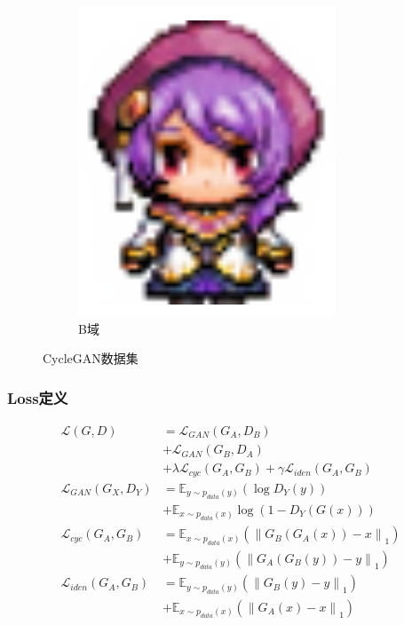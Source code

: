 \documentclass{beamer}
\newcommand\norm[1]{\left\lVert#1\right\rVert}
\begin{document}
\begin{frame}
\begin{figure}[htb]
\begin{subfigure}[b]{0.2\linewidth}
        \includegraphics[width=\linewidth]{bigsprite.png}
        \caption{B域}
      \end{subfigure}
      \caption{CycleGAN数据集}
      \label{fig:hp2sprite}
\end{figure}

\end{frame}

\begin{frame}
\frametitle{Loss定义}
\begin{align*}
    \mathcal{L}(G,D) &= \mathcal{L}_{GAN}(G_A,D_B) \\
                                    &+ \mathcal{L}_{GAN}(G_B,D_A) \\
                                    &+ \lambda \mathcal{L}_{cyc}(G_A,G_B) + \gamma \mathcal{L}_{iden}(G_A,G_B) \\
        \mathcal{L}_{GAN}(G_X,D_Y) &= \mathbb{E}_{y\sim p_{data}(y)}(\log D_Y(y))  \\
                                    &+ \mathbb{E}_{x \sim p_{data}(x)} \log(1-D_Y(G(x)))  \\
        \mathcal{L}_{cyc}(G_A,G_B) &= \mathbb{E}_{x\sim p_{data}(x)} (\norm{G_B(G_A(x)) - x}_1) \\
                                    &+ \mathbb{E}_{y\sim p_{data}(y)} (\norm{G_A(G_B(y)) - y}_1) \\
        \mathcal{L}_{iden}(G_A,G_B) &= \mathbb{E}_{y \sim p_{data}(y)}(\norm{G_B(y)-y}_1) \\
                                    &+ \mathbb{E}_{x \sim p_{data}(x)}(\norm{G_A(x)-x}_1)
    \end{align*}
        
\end{frame}
\end{document}
